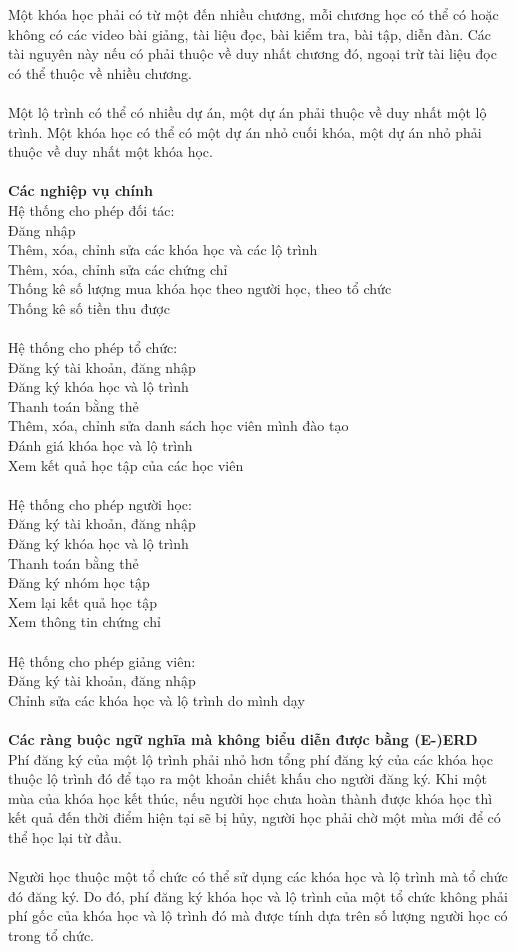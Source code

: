 \documentclass[12pt,a4paper,titlepage]{article}
\begin{document}
Một khóa học phải có từ một đến nhiều chương, mỗi chương học có thể có hoặc không có các video bài giảng, tài liệu đọc, bài kiểm tra, bài tập, diễn đàn. Các tài nguyên này nếu có phải thuộc về duy nhất chương đó, ngoại trừ tài liệu đọc có thể thuộc về nhiều chương.\\\\
Một lộ trình có thể có nhiều dự án, một dự án phải thuộc về duy nhất một lộ trình. Một khóa học có thể có một dự án nhỏ cuối khóa, một dự án nhỏ phải thuộc về duy nhất một khóa học.\\\\
\textbf{Các nghiệp vụ chính}\\
Hệ thống cho phép đối tác:\\
Đăng nhập\\
Thêm, xóa, chỉnh sửa các khóa học và các lộ trình\\
Thêm, xóa, chỉnh sửa các chứng chỉ\\
Thống kê số lượng mua khóa học theo người học, theo tổ chức\\
Thống kê số tiền thu được\\\\
Hệ thống cho phép tổ chức:\\
Đăng ký tài khoản, đăng nhập\\
Đăng ký khóa học và lộ trình\\
Thanh toán bằng thẻ\\
Thêm, xóa, chỉnh sửa danh sách học viên mình đào tạo\\
Đánh giá khóa học và lộ trình\\
Xem kết quả học tập của các học viên\\\\
Hệ thống cho phép người học:\\
Đăng ký tài khoản, đăng nhập\\
Đăng ký khóa học và lộ trình\\
Thanh toán bằng thẻ\\
Đăng ký nhóm học tập\\
Xem lại kết quả học tập\\
Xem thông tin chứng chỉ\\\\
Hệ thống cho phép giảng viên:\\
Đăng ký tài khoản, đăng nhập\\
Chỉnh sửa các khóa học và lộ trình do mình dạy\\\\
\textbf{Các ràng buộc ngữ nghĩa mà không biểu diễn được bằng (E-)ERD}\\
Phí đăng ký của một lộ trình phải nhỏ hơn tổng phí đăng ký của các khóa học thuộc lộ trình đó để tạo ra một khoản chiết khấu cho người đăng ký.
Khi một mùa của khóa học kết thúc, nếu người học chưa hoàn thành được khóa học thì kết quả đến thời điểm hiện tại sẽ bị hủy, người học phải chờ một mùa mới để có thể học lại từ đầu.\\\\
Người học thuộc một tổ chức có thể sử dụng các khóa học và lộ trình mà tổ chức đó đăng ký. Do đó, phí đăng ký khóa học và lộ trình của một tổ chức không phải phí gốc của khóa học và lộ trình đó mà được tính dựa trên số lượng người học có trong tổ chức.
\end{document}
